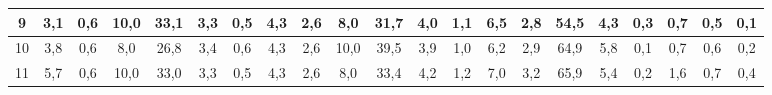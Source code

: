 \begin{sidewaystable}[]
\begin{tabular}{|c|c|c|c|c|c|c|c|c|c|c|c|c|c|c|c|c|c|c|c|c|}
    9  &  3,1                                              & 0,6                                              & 10,0                                             & 33,1                                             & 3,3                                              & 0,5                                              & 4,3                                              & 2,6                                              & 8,0                                              & 31,7                                             & 4,0                                              & 1,1                                              & 6,5                                              & 2,8                                              & 54,5                                             & 4,3                                              & 0,3                                              & 0,7                                              & 0,5                                              & 0,1                                              \\ \hline
    10 &  3,8                                              & 0,6                                              & 8,0                                              & 26,8                                             & 3,4                                              & 0,6                                              & 4,3                                              & 2,6                                              & 10,0                                             & 39,5                                             & 3,9                                              & 1,0                                              & 6,2                                              & 2,9                                              & 64,9                                             & 5,8                                              & 0,1                                              & 0,7                                              & 0,6                                              & 0,2                                              \\ \hline
    11 &  5,7                                              & 0,6                                              & 10,0                                             & 33,0                                             & 3,3                                              & 0,5                                              & 4,3                                              & 2,6                                              & 8,0                                              & 33,4                                             & 4,2                                              & 1,2                                              & 7,0                                              & 3,2                                              & 65,9                                             & 5,4                                              & 0,2                                              & 1,6                                              & 0,7                                              & 0,4                                              \\ \hline

\end{tabular}
\end{sidewaystable}
